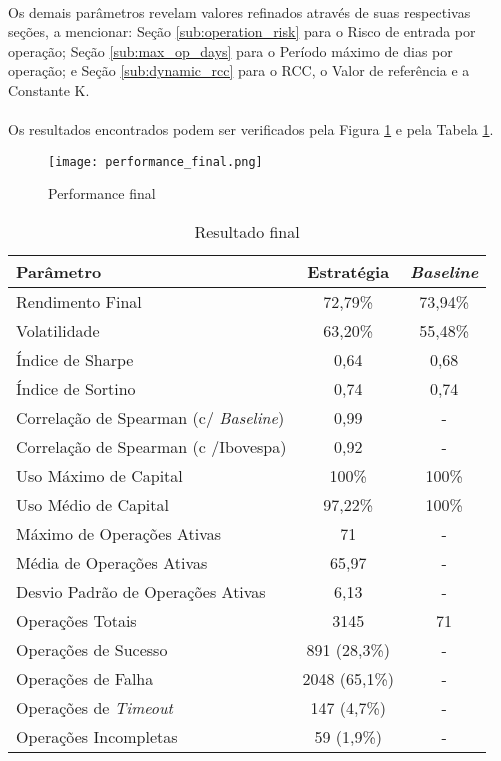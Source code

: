 \paragraph{} Os demais parâmetros revelam valores refinados através de suas respectivas seções, a mencionar: Seção \ref{sub:operation_risk} para o Risco de entrada por operação; Seção \ref{sub:max_op_days} para o Período máximo de dias por operação; e Seção \ref{sub:dynamic_rcc} para o RCC, o Valor de referência e a Constante K.

\paragraph{} Os resultados encontrados podem ser verificados pela Figura \ref{fig:250} e pela Tabela \ref{tab:13}.

\begin{figure}[!htb]
    \texttt{[image: performance\_final.png]}
    \centering
    \caption{Performance final}
    \label{fig:250}
\end{figure}

\begin{table}[h!] %
    \begin{center}
        \begin{tabular}{ l|c|c }
            Parâmetro & Estratégia & \textit{Baseline} \\
            \hline
            Rendimento Final & 72,79\% & 73,94\% \\
            Volatilidade & 63,20\% & 55,48\% \\
            Índice de Sharpe & 0,64 & 0,68 \\
            Índice de Sortino & 0,74 & 0,74 \\
            Correlação de Spearman (c/ \textit{Baseline}) & 0,99 & - \\
            Correlação de Spearman (c /Ibovespa) & 0,92 & - \\
            Uso Máximo de Capital & 100\% & 100\% \\
            Uso Médio de Capital & 97,22\% & 100\% \\
            Máximo de Operações Ativas & 71 & - \\
            Média de Operações Ativas & 65,97 & - \\
            Desvio Padrão de Operações Ativas & 6,13 & -\\
            Operações Totais & 3145 & 71 \\
            Operações de Sucesso & 891 (28,3\%) & - \\
            Operações de Falha & 2048 (65,1\%) & - \\
            Operações de \textit{Timeout} & 147 (4,7\%) & - \\
            Operações Incompletas & 59 (1,9\%) & - \\
        \end{tabular}
        \caption{Resultado final}
        \label{tab:13}
    \end{center}
\end{table}

